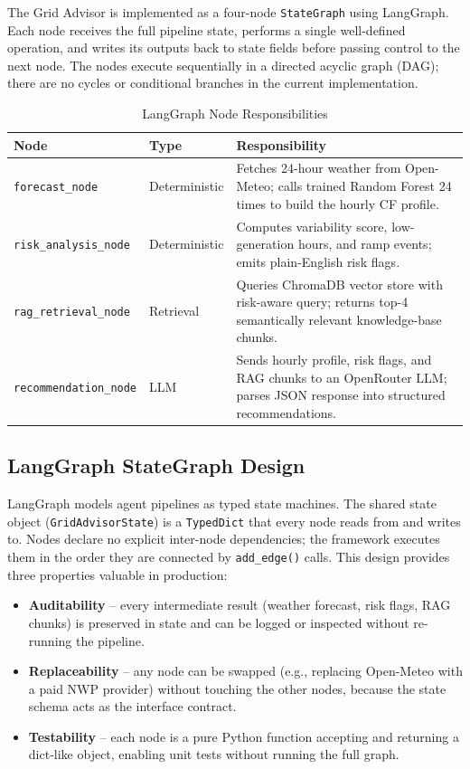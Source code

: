 \documentclass[12pt, a4paper]{article}
\begin{document}
The Grid Advisor is implemented as a four-node \texttt{StateGraph} using LangGraph. Each node receives the full pipeline state, performs a single well-defined operation, and writes its outputs back to state fields before passing control to the next node. The nodes execute sequentially in a directed acyclic graph (DAG); there are no cycles or conditional branches in the current implementation.

\begin{table}[H]
    \centering
    \caption{LangGraph Node Responsibilities}
    \begin{tabularx}{\textwidth}{llX}
        \toprule
        \textbf{Node} & \textbf{Type} & \textbf{Responsibility} \\
        \midrule
        \texttt{forecast\_node} & Deterministic & Fetches 24-hour weather from Open-Meteo; calls trained Random Forest 24 times to build the hourly CF profile. \\
        \texttt{risk\_analysis\_node} & Deterministic & Computes variability score, low-generation hours, and ramp events; emits plain-English risk flags. \\
        \texttt{rag\_retrieval\_node} & Retrieval & Queries ChromaDB vector store with risk-aware query; returns top-4 semantically relevant knowledge-base chunks. \\
        \texttt{recommendation\_node} & LLM & Sends hourly profile, risk flags, and RAG chunks to an OpenRouter LLM; parses JSON response into structured recommendations. \\
        \bottomrule
    \end{tabularx}
\end{table}

\subsection{LangGraph StateGraph Design}

LangGraph models agent pipelines as typed state machines. The shared state object (\texttt{GridAdvisorState}) is a \texttt{TypedDict} that every node reads from and writes to. Nodes declare no explicit inter-node dependencies; the framework executes them in the order they are connected by \texttt{add\_edge()} calls. This design provides three properties valuable in production:

\begin{itemize}[noitemsep]
    \item \textbf{Auditability} -- every intermediate result (weather forecast, risk flags, RAG chunks) is preserved in state and can be logged or inspected without re-running the pipeline.
    \item \textbf{Replaceability} -- any node can be swapped (e.g., replacing Open-Meteo with a paid NWP provider) without touching the other nodes, because the state schema acts as the interface contract.
    \item \textbf{Testability} -- each node is a pure Python function accepting and returning a dict-like object, enabling unit tests without running the full graph.
\end{itemize}
\end{document}
